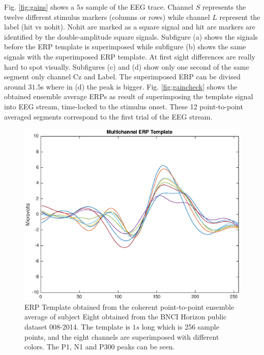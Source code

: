 \documentclass[brainsci,article,submit,moreauthors,pdftex,10pt,a4paper]{mdpi}
\begin{document}
Fig. \ref{fig:gains} shows a $5s$ sample of the EEG trace.  Channel $S$ represents the twelve different stimulus markers (columns or rows) while channel $L$ represent the label (hit vs nohit).  Nohit are marked as a square signal and hit are markers are identified by the double-amplitude square signals.  Subfigure (a) shows the signals before the ERP template is superimposed while subfigure (b) shows the same signals with the superimposed ERP template.  At first sight differences are really hard to spot visually.  Subfigures (c) and (d) show only one second of the same segment only channel Cz and Label.  The superimposed ERP can be divised around $31.5$s where in (d) the peak is bigger.  Fig. \ref{fig:gaincheck} shows the obtained ensemble average ERPs as result of superimposing the template signal into EEG stream, time-locked to the stimulus onset.   These 12 point-to-point averaged segments correspond to the first trial of the EEG stream.


\begin{figure}[H]
\centering
\includegraphics[width=12cm]{images/erptemplate1.eps}
\caption{ERP Template obtained from the coherent point-to-point ensemble average of subject Eight obtained from the BNCI Horizon public dataset 008-2014. The template is $1s$ long which is 256 sample points, and the eight channels are superimposed with different colors.  The P1, N1 and P300 peaks can be seen.}
\label{fig:erptemplate1}
\end{figure}
\end{document}
